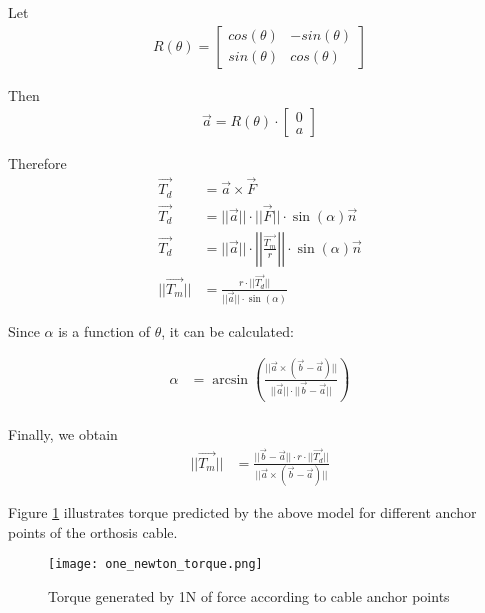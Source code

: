 Let  
\begin{align*}
  R(\theta)=\begin{bmatrix} cos(\theta) & -sin(\theta) \\ sin(\theta) & cos(\theta) \end{bmatrix}
\end{align*}  

Then  
\begin{align*}
  \vec{a}=R(\theta) \cdot \begin{bmatrix} 0 \\ a \end{bmatrix}
\end{align*}  

Therefore  
\begin{align*}
  \vec{T_d} &= \vec{a} \times \vec{F} \\  
  \vec{T_d} &= ||\vec{a}|| \cdot ||\vec{F}|| \cdot \sin(\alpha) \vec{n} \\  
  \vec{T_d} &= ||\vec{a}|| \cdot \left|\left| \frac{\vec{T_m}}{r} \right|\right| \cdot \sin(\alpha) \vec{n} \\  
  ||\vec{T_m}|| &= \frac{r \cdot ||\vec{T_d}||}{||\vec{a}|| \cdot \sin(\alpha)}  
\end{align*}  

Since $\alpha$ is a function of $\theta$, it can be calculated:   

\begin{align*}
  \alpha &= \arcsin(\frac{||\vec{a} \times (\vec{b}-\vec{a})||}{||\vec{a}|| \cdot ||\vec{b}-\vec{a}||}) \\  
\end{align*}  

Finally, we obtain
\begin{align*}
  ||\vec{T_m}|| &= \frac{||\vec{b}-\vec{a}|| \cdot r \cdot ||\vec{T_d}||}{||\vec{a} \times (\vec{b}-\vec{a})||}  
\end{align*}  

Figure \ref{fig:model_1N} illustrates torque predicted by the above model for 
different anchor points of the orthosis cable. 

\begin{figure}[htbp]
  \centering
  \texttt{[image: one\_newton\_torque.png]}
  \caption{Torque generated by 1N of force according to cable anchor points}
  \label{fig:model_1N}
\end{figure}
\FloatBarrier

